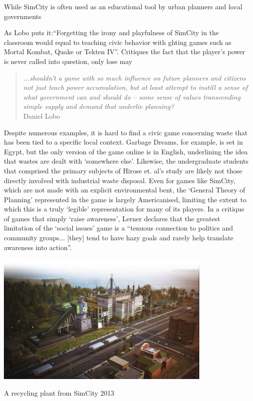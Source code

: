 \documentclass[nofonts,nols,justified,nobib]{tufte-book}
\begin{document}
While SimCity is often used as an educational tool by urban planners and local governments \cite{gaber_simulating_2007, lobo_city_2004}

As Lobo puts it:``Forgetting the irony and playfulness of SimCity in the classroom would equal to teaching civic behavior with  ghting games such as Mortal Kombat, Quake or Tekten IV''. Critiques the fact that the player's power is never called into question, only lose may

\begin{quote}
\emph{...shouldn’t a game with so much influence on future planners and citizens not just teach power accumulation, but at least attempt to instill a sense of what government can and should do -- some sense of values transcending simple supply and demand that underlie planning?} \cite{lobo_city_2004}\\
Daniel Lobo
\end{quote}


Despite numerous examples, it is hard to find a civic game concerning waste that has been tied to a specific local context. Garbage Dreams, for example, is set in Egypt, but the only version of the game online is in English, underlining the idea that wastes are dealt with `somewhere else'. Likewise, the undergraduate students that comprised the primary subjects of Hirose et. al's study are likely not those directly involved with industrial waste disposal. Even for games like SimCity, which are not made with an explicit environmental bent, the `General Theory of Planning' represented in the game is largely Americanised, limiting the extent to which this is a truly `legible' representation for many of its players. In a critique of games that simply `raise awareness', Lerner declares that the greatest limitation of the `social issues' game is a ``tenuous connection to politics and community groups... [they] tend to have hazy goals and rarely help translate awareness into action''.


\begin{marginfigure}
\includegraphics[width=\textwidth]{img/1/simcity2013-recycling.jpeg}
\caption{A recycling plant from SimCity 2013 \cite{noauthor_garbage_2013} \label{b}}
\end{marginfigure}
\end{document}
